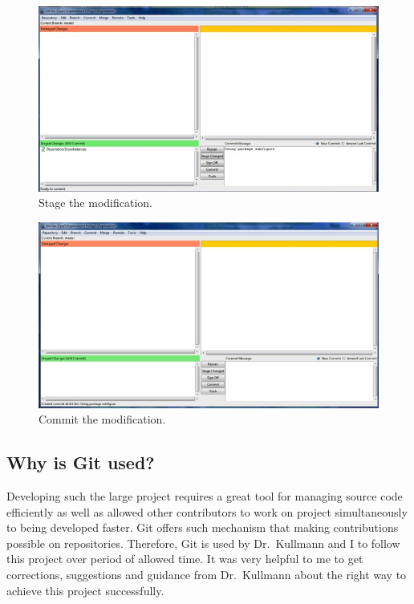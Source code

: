 \documentclass[11pt]{report}
\begin{document}
\begin{figure}[h]
\begin{center}
\includegraphics[scale=0.50]{../GitPhotos/GitStage.jpg}
\caption{Stage the modification.}
\label{fig:gitstage}
\end{center}
\end{figure}
\begin{figure}[h]
\begin{center}
\includegraphics[scale=0.50]{../GitPhotos/GitCommit.jpg}
\caption{Commit the modification.}
\label{fig:gitcommit}
\end{center}
\end{figure}

\subsection{Why is Git used?}
\label{subsec: why git}
Developing such the large project requires a great tool for managing source code efficiently as well as allowed other contributors to work on project simultaneously to being developed faster. Git offers such mechanism that making contributions possible on repositories. Therefore, Git is used by Dr.~Kullmann and I to follow this project over period of allowed time. It was very helpful to me to get corrections, suggestions and guidance from Dr.~Kullmann about the right way to achieve this project successfully.
\end{document}
